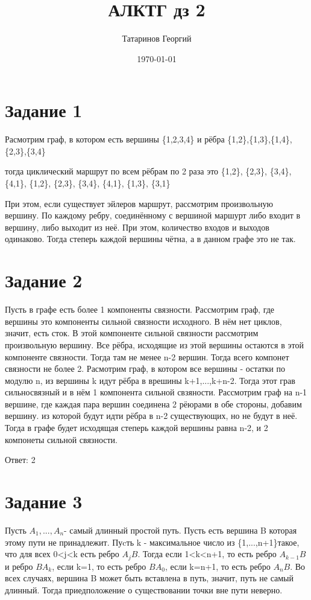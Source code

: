 \documentclass[a4paper, 12pt]{article}
\title{АЛКТГ дз 2}
\author{Татаринов Георгий}
\date{\today}
\renewcommand{\d}{$}
\begin{document}
	\maketitle
	\section*{Задание 1}
		Расмотрим граф, в котором есть вершины \{1,2,3,4\} и рёбра \{1,2\},\{1,3\},\{1,4\},\{2,3\},\{3,4\}

		тогда циклический маршрут по всем рёбрам по 2 раза это \{1,2\}, \{2,3\}, \{3,4\}, \{4,1\}, \{1,2\}, \{2,3\}, \{3,4\}, \{4,1\}, \{1,3\}, \{3,1\}

		При этом, если существует эйлеров маршрут, рассмотрим произвольную вершину. По каждому ребру, соединённому с вершиной маршурт либо входит в вершину, либо выходит из неё. При этом, количество входов и выходов одинаково. Тогда степерь каждой вершины чётна, а в данном графе это не так.
	\section*{Задание 2}
		Пусть в графе есть более 1 компоненты связности. Рассмотрим граф, где вершины это компоненты сильной связности исходного. В нём нет циклов, значит, есть сток. В этой компоненте сильной связности рассмотрим произвольную вершину. Все рёбра, исходящие из этой вершины остаются в этой компоненте связности. Тогда там не менее n-2 вершин. Тогда всего компонет связности не более 2. Расмотрим граф, в котором все вершины - остатки по модулю n, из вершины k идут рёбра в врешины k+1,...,k+n-2. Тогда этот грав сильносвязный и в нём 1 компонента сильной свзяности. Рассмотрим граф на n-1 вершине, где каждая пара вершин соединена 2 рёюрами в обе стороны, добавим вершину. из которой будут идти рёбра в n-2 существующих, но не будут в неё. Тогда в графе будет исходящая степерь каждой вершины равна n-2, и 2 компонеты сильной связности.

		Ответ: 2
	\section*{Задание 3}
		Пусть \d A_1,...,A_n \d - самый длинный простой путь. Пусть есть вершина B которая этому пути не принадлежит. Пуcть k - максимальное число из \{1,...,n+1\}такое, что для всех 0<j<k есть ребро $A_jB$. Тогда если 1<k<n+1, то есть ребро $A_{k-1}B$ и ребро $BA_{k}$, если k=1, то есть ребро $BA_0$, если k=n+1, то есть ребро $A_nB$. Во всех случаях, вершина B может быть вставлена в путь, значит, путь не самый длинный. Тогда приедположение о существовании точки вне пути неверно.
\end{document}

